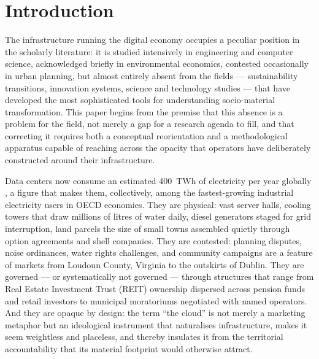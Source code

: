 \section{Introduction}
\label{sec:introduction}

The infrastructure running the digital economy occupies a peculiar position in the scholarly literature: it is studied intensively in engineering and computer science, acknowledged briefly in environmental economics, contested occasionally in urban planning, but almost entirely absent from the fields — sustainability transitions, innovation systems, science and technology studies — that have developed the most sophisticated tools for understanding socio-material transformation. This paper begins from the premise that this absence is a problem for the field, not merely a gap for a research agenda to fill, and that correcting it requires both a conceptual reorientation and a methodological apparatus capable of reaching across the opacity that operators have deliberately constructed around their infrastructure.

Data centers now consume an estimated 400~TWh of electricity per year globally \citep{iea2024electricity}, a figure that makes them, collectively, among the fastest-growing industrial electricity users in OECD economies. They are physical: vast server halls, cooling towers that draw millions of litres of water daily, diesel generators staged for grid interruption, land parcels the size of small towns assembled quietly through option agreements and shell companies. They are contested: planning disputes, noise ordinances, water rights challenges, and community campaigns are a feature of markets from Loudoun County, Virginia to the outskirts of Dublin. They are governed — or systematically not governed — through structures that range from Real Estate Investment Trust (REIT) ownership dispersed across pension funds and retail investors to municipal moratoriums negotiated with named operators. And they are opaque by design: the term ``the cloud'' is not merely a marketing metaphor but an ideological instrument that naturalises infrastructure, makes it seem weightless and placeless, and thereby insulates it from the territorial accountability that its material footprint would otherwise attract.



